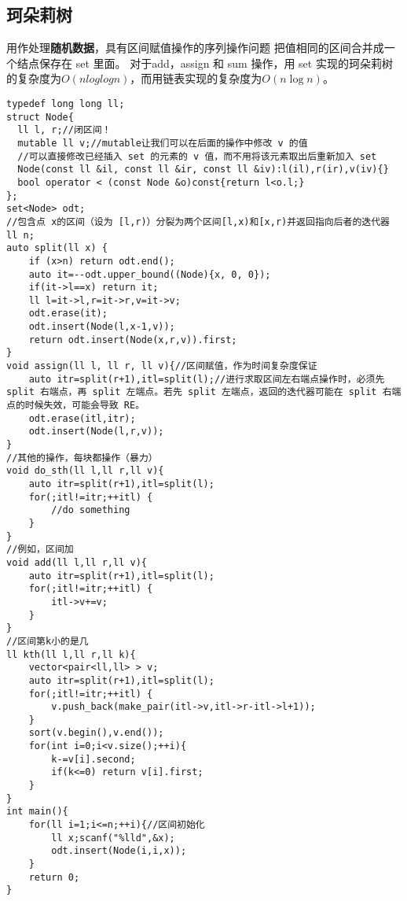 \documentclass[UTF8]{ctexart}
\begin{document}
\subsection{珂朵莉树}
用作处理\textbf{随机数据}，具有区间赋值操作的序列操作问题
把值相同的区间合并成一个结点保存在 set 里面。
对于add，assign 和 sum 操作，用 set 实现的珂朵莉树的复杂度为$O(nloglogn)$，而用链表实现的复杂度为$O(n\log n)$。
\begin{lstlisting}
typedef long long ll;
struct Node{
  ll l, r;//闭区间！
  mutable ll v;//mutable让我们可以在后面的操作中修改 v 的值
  //可以直接修改已经插入 set 的元素的 v 值，而不用将该元素取出后重新加入 set
  Node(const ll &il, const ll &ir, const ll &iv):l(il),r(ir),v(iv){}
  bool operator < (const Node &o)const{return l<o.l;}
};
set<Node> odt;
//包含点 x的区间（设为 [l,r)）分裂为两个区间[l,x)和[x,r)并返回指向后者的迭代器
ll n;
auto split(ll x) {
	if (x>n) return odt.end();
	auto it=--odt.upper_bound((Node){x, 0, 0});
	if(it->l==x) return it;
	ll l=it->l,r=it->r,v=it->v;
	odt.erase(it);
	odt.insert(Node(l,x-1,v));
	return odt.insert(Node(x,r,v)).first;
} 
void assign(ll l, ll r, ll v){//区间赋值，作为时间复杂度保证
	auto itr=split(r+1),itl=split(l);//进行求取区间左右端点操作时，必须先 split 右端点，再 split 左端点。若先 split 左端点，返回的迭代器可能在 split 右端点的时候失效，可能会导致 RE。
	odt.erase(itl,itr);
	odt.insert(Node(l,r,v));
}
//其他的操作，每块都操作（暴力）
void do_sth(ll l,ll r,ll v){
	auto itr=split(r+1),itl=split(l);
	for(;itl!=itr;++itl) {
		//do something
	}
}
//例如，区间加
void add(ll l,ll r,ll v){
	auto itr=split(r+1),itl=split(l);
	for(;itl!=itr;++itl) {
		itl->v+=v;	
	}
}
//区间第k小的是几
ll kth(ll l,ll r,ll k){
	vector<pair<ll,ll> > v;
	auto itr=split(r+1),itl=split(l);
	for(;itl!=itr;++itl) {
		v.push_back(make_pair(itl->v,itl->r-itl->l+1));
	}
	sort(v.begin(),v.end());
	for(int i=0;i<v.size();++i){
		k-=v[i].second;
		if(k<=0) return v[i].first;
	}
}
int main(){
	for(ll i=1;i<=n;++i){//区间初始化
        ll x;scanf("%lld",&x);
		odt.insert(Node(i,i,x));
	}
	return 0;
}
\end{lstlisting}
\end{document}
